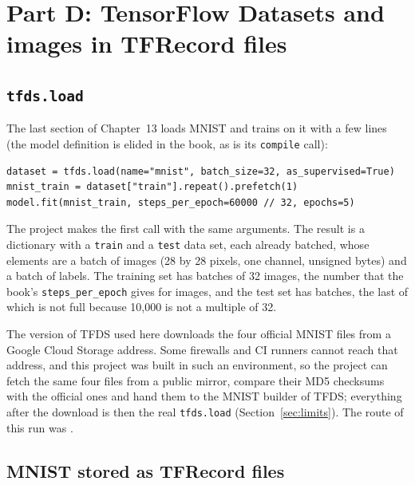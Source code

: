 \section{Part D: TensorFlow Datasets and images in TFRecord files}
\label{sec:tfds}

\subsection{\texttt{tfds.load}}

The last section of Chapter~13 loads MNIST and trains on it with a few lines (the model definition is elided in the book, as is its \texttt{compile} call):

\begin{verbatim}
dataset = tfds.load(name="mnist", batch_size=32, as_supervised=True)
mnist_train = dataset["train"].repeat().prefetch(1)
model.fit(mnist_train, steps_per_epoch=60000 // 32, epochs=5)
\end{verbatim}

The project makes the first call with the same arguments. The result is a dictionary with a \texttt{train} and a \texttt{test} data set, each already batched, whose elements are a batch of images (28 by 28 pixels, one channel, unsigned bytes) and a batch of labels. The training set has  batches of 32 images, the number that the book's \texttt{steps\_per\_epoch} gives for  images, and the test set has  batches, the last of which is not full because 10,000 is not a multiple of 32.

The version of TFDS used here downloads the four official MNIST files from a Google Cloud Storage address. Some firewalls and CI runners cannot reach that address, and this project was built in such an environment, so the project can fetch the same four files from a public mirror, compare their MD5 checksums with the official ones and hand them to the MNIST builder of TFDS; everything after the download is then the real \texttt{tfds.load} (Section~\ref{sec:limits}). The route of this run was \texttt{}.

\subsection{MNIST stored as TFRecord files}

